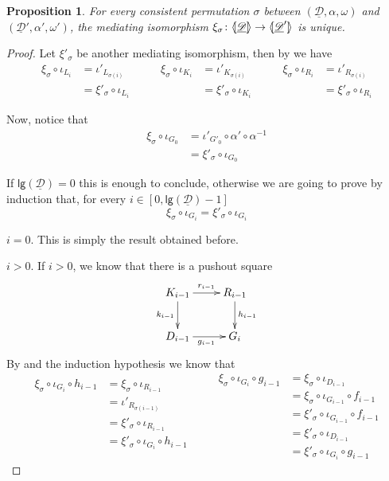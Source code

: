 \documentclass[a4paper]{article}
\newcommand{\dder}[1]{\mathscr{#1}}
\newcommand{\der}[1]{\underline{\dder{#1}}}
\newcommand{\lpro}{\langle \hspace{-1.85pt}[}
\newcommand{\rpro}{]\hspace{-1.85pt}\rangle}
\newcommand{\tpro}[1]{\lpro \der{#1}\rpro}
\newcommand{\lgh}[0]{\mathsf{lg}}
\newtheorem{proposition}[theorem]{Proposition}
\theoremstyle{definition}
\begin{document}
\begin{proposition}\label{prop:isouno} For every consistent permutation $\sigma$ between  $(\der{D}, \alpha, \omega)$ and $(\der{D}', \alpha', \omega')$, the mediating isomorphism $\xi_\sigma\colon \tpro{D}\to \lpro \der{D}'\rpro$ is unique.
\end{proposition}
\begin{proof} Let $\xi'_\sigma$ be another mediating isomorphism, then by  we have
	\[\begin{split}
		\xi_\sigma \circ \iota_{L_i}&=\iota'_{L_{\sigma(i)}}\\&=\xi'_\sigma\circ \iota_{L_i}
	\end{split} \qquad \begin{split}
		\xi_\sigma \circ \iota_{K_i}&=\iota'_{K_{\sigma(i)}}\\&=\xi'_\sigma\circ \iota_{K_i}
	\end{split} \qquad \begin{split}
		\xi_\sigma \circ \iota_{R_i}&=\iota'_{R_{\sigma(i)}}\\&=\xi'_\sigma\circ \iota_{R_i}
	\end{split}\]
	
	Now, notice that 
	\begin{align*}
	\xi_\sigma \circ \iota_{G_0}&=\iota'_{G'_0}\circ \alpha'\circ \alpha^{-1}\\&=\xi'_\sigma \circ \iota_{G_0}
	\end{align*}
	
	If $\lgh(\der{D})=0$ this is enough to conclude, otherwise we are going to prove by induction that, for every $i\in [0, \lgh(\der{D})-1]$
	\[
		\xi_\sigma \circ \iota_{G_i}=\xi'_\sigma\circ \iota_{G_i}
	\]	
	
	\smallskip \noindent $i=0$. This is simply the result obtained before.
	
	\smallskip \noindent $i >0$. If $i>0$, we know that there is a pushout square
	\[\xymatrix{K_{i-1}\ar[r]^{r_{i-1}} \ar[d]_{k_{i-1}}& R_{i-1} \ar[d]^{h_{i-1}}\\ D_{i-1} \ar[r]_{g_{i-1}}& G_i}\] 
	By  and the induction hypothesis we know that
\[\begin{split}
			\xi_\sigma \circ \iota_{G_i}\circ h_{i-1}&=  \xi_\sigma\circ \iota_{R_{i-1}}\\&=\iota'_{R_{\sigma(i-1)}}\\&=\xi'_{\sigma}\circ \iota_{R_{i-1}}\\&=\xi'_{\sigma} \circ \iota_{G_i}\circ h_{i-1}\\&
\end{split} \qquad
	\begin{split}
	\xi_\sigma \circ \iota_{G_i}\circ g_{i-1}&=\xi_{\sigma}\circ \iota_{D_{i-1}}\\&=\xi_{\sigma}\circ \iota_{G_{i-1}} \circ f_{i-1}\\&=\xi'_{\sigma}\circ \iota_{G_{i-1}} \circ f_{i-1}\\&=\xi'_{\sigma}\circ \iota_{D_{i-1}} \\&=\xi'_{\sigma}\circ \iota_{G_{i}} \circ g_{i-1}
\end{split}
\]


\end{proof}
\end{document}
